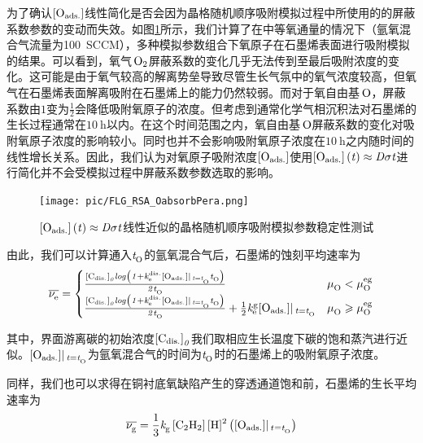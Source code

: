 为了确认$\rm{\left[O_{ads.}\right]} \it$线性简化是否会因为晶格随机顺序吸附模拟过程中所使用的的屏蔽系数参数的变动而失效。如图\ref{fig:FLG_RSA_OabsorbPera}所示，我们计算了在中等氧通量的情况下（氩氧混合气流量为\SI{100}{SCCM}），多种模拟参数组合下氧原子在石墨烯表面进行吸附模拟的结果。可以看到，氧气$\cemb{O2}$屏蔽系数的变化几乎无法传到至最后吸附浓度的变化。这可能是由于氧气较高的解离势垒导致尽管生长气氛中的氧气浓度较高，但氧气在石墨烯表面解离吸附在石墨烯上的能力仍然较弱。而对于氧自由基$\cemb{O}$，屏蔽系数由$1$变为$\frac{1}{2}$会降低吸附氧原子的浓度。但考虑到通常化学气相沉积法对石墨烯的生长过程通常在$\SI{10}{\hour}$以内。在这个时间范围之内，氧自由基$\cemb{O}$屏蔽系数的变化对吸附氧原子浓度的影响较小。同时也并不会影响吸附氧原子浓度在$\SI{10}{\hour}$之内随时间的线性增长关系。因此，我们认为对氧原子吸附浓度$\rm{\left[O_{ads.}\right]} \it$使用$\rm{\left[O_{ads.}\right]} \it\left(\it t\right)\approx \it D \sigma t$进行简化并不会受模拟过程中屏蔽系数参数选取的影响。

\begin{figure}[htb]
    \texttt{[image: pic/FLG\_RSA\_OabsorbPera.png]}
    \caption{$\rm{\left[O_{ads.}\right]} \it\left(\it t\right)\approx \it D \sigma t$线性近似的晶格随机顺序吸附模拟参数稳定性测试}
    \label{fig:FLG_RSA_OabsorbPera}
\end{figure}

由此，我们可以计算通入$\it{t_{\rm O}^{\rm }} \it$的氩氧混合气后，石墨烯的蚀刻平均速率为\chinesecolon
\begin{equation}
    \label{eq:FLG_avgVe}
    \overline{\it \nu_{\rm e}^{\rm } \it}=
    \begin{cases}
        \frac{\rm{\left[C_{dis.}\right]} \it_0 log\left( 1+\it{k_{\rm e}^{\rm dis.}} \it\rm{\left[O_{ads.}\right]} \it | \,_{t=\it{t_{\rm O}^{\rm }} \it} \it{t_{\rm O}^{\rm }} \it \right) }{\it 2 \it{t_{\rm O}^{\rm }} \it}                                                        & \it \mu_{\rm O}^{\rm } \it < \it \mu_{\rm O}^{\rm eg} \it         \\
        \frac{\rm{\left[C_{dis.}\right]} \it_0 log\left( 1+\it{k_{\rm e}^{\rm dis.}} \it\rm{\left[O_{ads.}\right]} \it | \,_{t=\it{t_{\rm O}^{\rm }} \it} \it{t_{\rm O}^{\rm }} \it \right) }{\it 2 \it{t_{\rm O}^{\rm }} \it} + \frac{1}{2}\it{k_{\rm e}^{\rm g}} \it\rm{\left[O_{ads.}\right]} \it| \,_{t=\it{t_{\rm O}^{\rm }} \it} & \it \mu_{\rm O}^{\rm } \it \geqslant \it \mu_{\rm O}^{\rm eg} \it
    \end{cases}
\end{equation}

其中，界面游离碳的初始浓度$\rm{\left[C_{dis.}\right]} \it_0$我们取相应生长温度下碳的饱和蒸汽进行近似。$\rm{\left[O_{ads.}\right]} \it| \,_{t=\it{t_{\rm O}^{\rm }} \it}$为氩氧混合气的时间为$\it{t_{\rm O}^{\rm }} \it$时的石墨烯上的吸附氧原子浓度。

同样，我们也可以求得在铜衬底氧缺陷产生的穿透通道饱和前，石墨烯的生长平均速率为\chinesecolon
\begin{equation}
    \label{eq:FLG_avgVg}
    \overline{\RateV{g}{}} =\frac{1}{3}\RateK{g}{}\cemb{[C2H2]}\cemb{[H]^2}\left(\Oads |_{\,\ReactTime{}{}=\ReactTime{O}{}} \right)
\end{equation}

